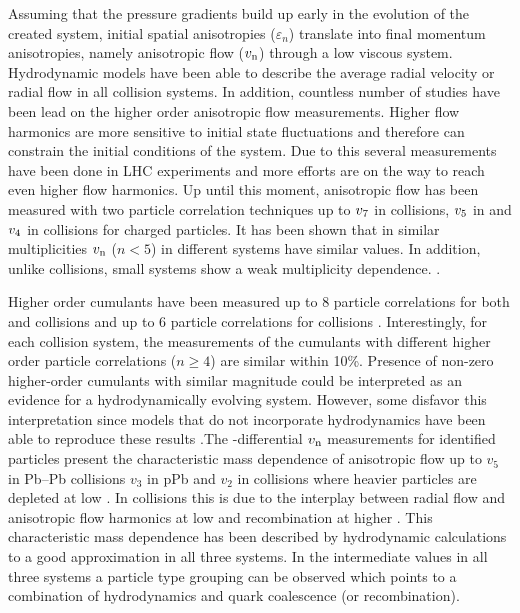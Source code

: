 \documentclass[../report.tex]{subfiles}
\begin{document}
Assuming that the pressure gradients build up early in the evolution of the created system, initial spatial anisotropies ($\varepsilon_n$) translate into final momentum anisotropies, namely anisotropic flow ($v_{\rm{n}}$) through a low viscous system. Hydrodynamic models have been able to describe the average radial velocity or radial flow in all collision systems. In addition, countless number of studies have been lead on the higher order anisotropic flow measurements. Higher flow harmonics are more sensitive to initial state fluctuations and therefore can constrain the initial conditions of the system. Due to this several measurements have been done in LHC experiments and more efforts are on the way to reach even higher flow harmonics. Up until this moment, anisotropic flow has been measured with two particle correlation techniques up to $v_{\rm{7}}$ in \PbPb collisions, $v_{\rm{5}}$ in \pPb and $v_{\rm{4}}$ in \pp collisions for charged particles. It has been shown that in similar multiplicities $v_{\rm{n}}$ ($n<5$) in different systems have similar values. In addition, unlike \PbPb collisions, small systems show a weak multiplicity dependence. \cite{CMS:2012qk,Abelev:2012ola,Aad:2012gla,Aamodt:2011by,Chatrchyan:2011eka,Chatrchyan:2012wg,ATLAS:2012at,Aad:2014lta,Aad:2015gqa,CMS:2015zpa,Khachatryan:2016txc,Acharya:2017ino,Adam:2016ows,Adam:2016nfo,Acharya:2018zuq,Sirunyan:2017uyl,Aaboud:2017acw}.

Higher order cumulants have been measured up to 8 particle correlations for both \PbPb and \pPb collisions and up to 6 particle correlations for \pp collisions \cite{Aad:2013fja,Chatrchyan:2013nka,Khachatryan:2016txc,Aamodt:2010pa,ALICE:2011ab,Chatrchyan:2012ta,Abelev:2014mda,Chatrchyan:2013kba,Aad:2014vba,Khachatryan:2015waa,Adam:2016izf,CMS:2015ica,Sirunyan:2017pan,Sirunyan:2017igb,Aaboud:2017acw,Aaboud:2017blb}. Interestingly, for each collision system, the measurements of the cumulants with different higher order particle correlations ($n \geq 4$) are similar within 10\%. Presence of non-zero higher-order cumulants with similar magnitude could be interpreted as an evidence for a hydrodynamically evolving system. However, some disfavor this interpretation since models that do not incorporate hydrodynamics have been able to reproduce these results \cite{Sjostrand:2006za,Jia:2014pza,Gyulassy:2014cfa,McLerran:2014uka}.The \pt-differential $v_{\rm{n}}$ measurements for identified particles present the characteristic mass dependence of anisotropic flow up to $v_{5}$ in Pb--Pb collisions $v_{3}$ in pPb and $v_{2}$ in \pp collisions where heavier particles are depleted at low \pt \cite{Abelev:2014pua,Abelev:2012di,Adam:2016nfo,Khachatryan:2014jra,ABELEV:2013wsa,CMS:2015kua,Khachatryan:2016txc,Acharya:2018zuq}. In \PbPb collisions this is due to the interplay between radial flow and anisotropic flow harmonics at low \pt and recombination at higher \pt. This characteristic mass dependence has been described by hydrodynamic calculations to a good approximation in all three systems. In the intermediate \pt values in all three systems a particle type grouping can be observed which points to a combination of hydrodynamics and quark coalescence (or recombination).
\end{document}
